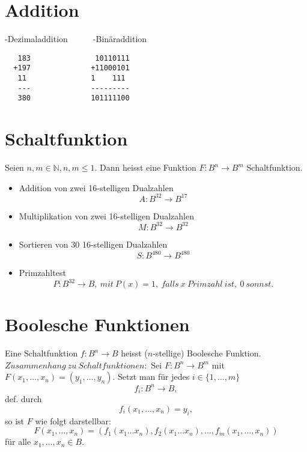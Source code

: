 \documentclass[../main.tex]{subfiles}
\begin{document}
\section{Addition}
-Dezimaladdition\ \ \ \ \ \ -Binäraddition\newline
\begin{verbatim}
   183               10110111
  +197              +11000101
   11               1    111
   ---              ---------
   380              101111100
\end{verbatim}
\section{Schaltfunktion}
\begin{definition}
    Seien $n,m \in \mathbb{N}, n,m \leq 1$. Dann heisst eine Funktion $F: B^n \rightarrow B^m$ Schaltfunktion.
\end{definition}
\begin{examples}\newline
    \begin{itemize}
        \item Addition von zwei 16-stelligen Dualzahlen
        \[A: B^{32} \rightarrow B^{17}\]
        \item Multiplikation von zwei 16-stelligen Dualzahlen
        \[M: B^{32} \rightarrow B^{32}\]
        \item Sortieren von 30 16-stelligen Dualzahlen
        \[S: B^{480} \rightarrow B^{480}\]
        \item Primzahltest
        \[P: B^{32} \rightarrow B,\ mit\ P(x)=1,\ falls\ x\ Primzahl\ ist,\ 0\ sonnst.\]
    \end{itemize}
\end{examples}
\section{Boolesche Funktionen}
\begin{definition}
    Eine Schaltfunktion $f : B^n \rightarrow B$ heisst ($n$-stellige) Boolesche Funktion.
    $Zusammenhang\ zu\ Schaltfunktionen:$ \newline
    Sei $F:B^n\rightarrow B^m$ mit $F(x_1,\ldots,x_n) = (y_1,\ldots,y_n)$. Setzt man für jedes $i \in \{1,\ldots,m\}$
    \[f_i : B^n \rightarrow B,\]
    def. durch
    \[ f_i(x_1,\ldots,x_n) = y_i,\]
    so ist $F$ wie folgt darstellbar:
    \[F(x_1,\ldots,x_n)=(f_1(x_1\ldots x_n),f_2(x_1 \ldots x_n),\ldots,f_m(x_1,\ldots,x_n))\]
    für alle $x_1,\ldots,x_n \in B$.
\end{definition}
\end{document}
